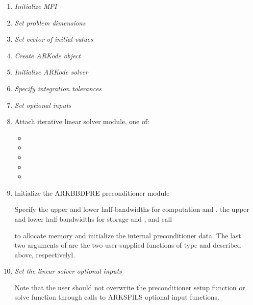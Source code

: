 \documentclass[letterpaper,10pt,english]{sphinxmanual}
\begin{document}
\begin{enumerate}
\item {} 
\emph{Initialize MPI}

\item {} 
\emph{Set problem dimensions}

\item {} 
\emph{Set vector of initial values}

\item {} 
\emph{Create ARKode object}

\item {} 
\emph{Initialize ARKode solver}

\item {} 
\emph{Specify integration tolerances}

\item {} 
\emph{Set optional inputs}

\item {} 
Attach iterative linear solver module, one of:
\begin{itemize}
\item {} 

\item {} 

\item {} 

\item {} 

\item {} 

\end{itemize}

\item {} 
Initialize the ARKBBDPRE preconditioner module

Specify the upper and lower half-bandwidths for computation
 and , the upper and lower half-bandwidths for
storage  and , and call


to allocate memory and initialize the internal preconditioner
data. The last two arguments of {\hyperref[c_interface/Preconditioners:ARKBBDPrecInit]{}} are the
two user-supplied functions of type {\hyperref[c_interface/Preconditioners:ARKLocalFn]{}} and
{\hyperref[c_interface/Preconditioners:ARKCommFn]{}} described above, respectivelyl.

\item {} 
\emph{Set the linear solver optional inputs}

Note that the user should not overwrite the preconditioner setup
function or solve function through calls to ARKSPILS optional
input functions.

\end{enumerate}
\end{document}
